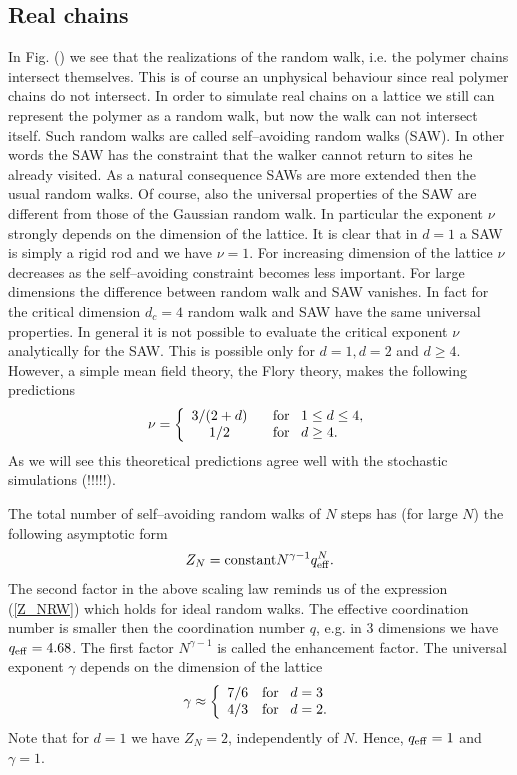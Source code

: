 \subsection{Real chains}
In Fig. () we see that the realizations of the random walk, i.e. 
the polymer chains intersect themselves. This is of course an 
unphysical behaviour since real polymer chains do not intersect.
In order to simulate real chains on a lattice we still can 
represent  the polymer as a random walk, but now the walk can not 
intersect itself. Such random walks are called self--avoiding 
random walks (SAW). In other words the SAW has the constraint that 
the walker cannot return to sites he already visited. As a natural 
consequence SAWs are more extended then the usual random walks. Of 
course, also the universal properties of the SAW are different 
from those of the Gaussian random walk. In particular the exponent
$\nu$ strongly depends on the dimension of the lattice. It is 
clear that in $d=1$ a SAW is simply a rigid rod and we have 
$\nu=1$. For increasing dimension of the lattice $\nu$ 
decreases as the self--avoiding constraint becomes less important. 
For large dimensions the difference between random walk and SAW 
vanishes. In fact for the critical dimension $d_c =4$ random walk 
and SAW have the same universal properties. In general it is not 
possible to evaluate the critical exponent $\nu$ analytically for the 
SAW. This is possible only for $d=1,d=2$ and $d \ge4$. However, a 
simple mean field theory, the Flory theory, makes the following 
predictions
\begin{equation*}
\nu = \left\{ \begin{array}{cl}
               3/(2+d) & \;\;\; {\rm for} \;\;\; 1 \le d \le 4, \\
               1/2     & \;\;\; {\rm for} \;\;\; d\ge 4.
\end{array}
       \right.
\end{equation*}
As we will see this theoretical predictions agree well with the 
stochastic simulations (!!!!!).

The total number of self--avoiding random walks of $N$  steps has 
(for large $N$) the following asymptotic form
\begin{equation*}
Z_N = {\rm constant} N^{\gamma-1} q_{\rm eff}^N.
\end{equation*}
The second factor in the above scaling law reminds us of the expression
(\ref{Z_NRW})  which holds for ideal random walks. The effective 
coordination number is smaller then the coordination number $q$, 
e.g. in 3 dimensions we have $q_{\rm eff}=4.68$. The first factor
$N^{\gamma -1}$  is called the enhancement factor. The universal
exponent $\gamma$ depends on the dimension of the lattice
\begin{equation*}
\gamma \approx \left\{ \begin{array}{cl}
                        7/6 & {\rm for} \;\;\; d=3 \\
                        4/3 & {\rm for} \;\;\; d=2.
                       \end{array}
               \right.
\end{equation*}
Note that for $d=1$ we have $Z_N = 2$, independently of $N$. 
Hence, $q_{\rm eff} = 1$ and $\gamma =1$.

